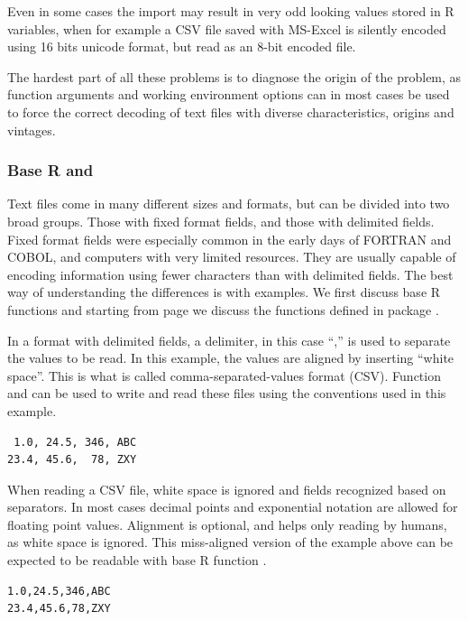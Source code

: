 \documentclass[krantz2,ChapterTOCs]{krantz}\usepackage{knitr}
\begin{document}
\begin{warningbox}
Even in some cases the import may result in very odd looking values stored in R variables, when for example a CSV file saved with MS-Excel is silently encoded using 16 bits unicode format, but read as an 8-bit encoded file.

The hardest part of all these problems is to diagnose the origin of the problem, as function arguments and working environment options can in most cases be used to force the correct decoding of text files with diverse characteristics, origins and vintages.
\end{warningbox}

\subsubsection[Base R and `utils']{Base R and }

Text files come in many different sizes and formats, but can be divided into two broad groups. Those with fixed format fields, and those with delimited fields. Fixed format fields were especially common in the early days of FORTRAN and COBOL, and computers with very limited resources. They are usually capable of encoding information using fewer characters than with delimited fields. The best way of understanding the differences is with examples. We first discuss base R functions and starting from page \pageref{sec:files:readr} we discuss the functions defined in package .

In a format with delimited fields, a delimiter, in this case ``,'' is used to separate the values to be read. In this example, the values are aligned by inserting ``white space''. This is what is called comma-separated-values format (CSV). Function  and  can be used to write and read these files using the conventions used in this example.
\begin{verbatim}
 1.0, 24.5, 346, ABC
23.4, 45.6,  78, ZXY
\end{verbatim}

When reading a CSV file, white space is ignored and fields recognized based on separators. In most cases decimal points and exponential notation are allowed for floating point values. Alignment is optional, and helps only reading by humans, as white space is ignored. This miss-aligned version of the example above can be expected to be readable with base R function .
\begin{verbatim}
1.0,24.5,346,ABC
23.4,45.6,78,ZXY
\end{verbatim}
\end{document}
